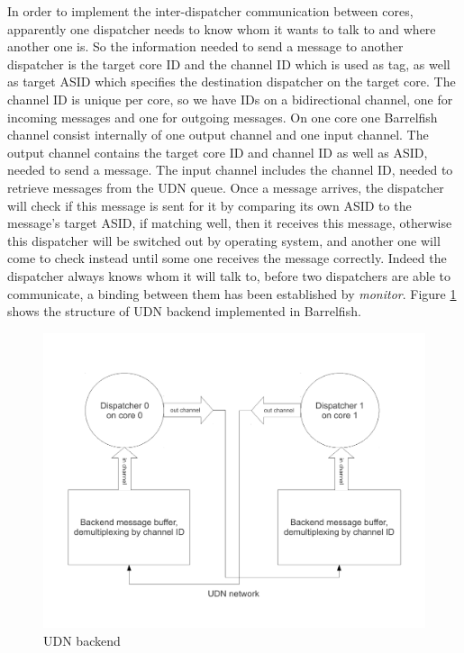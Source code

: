\documentclass[a4paper,twoside]{report} %
\begin{document}
In order to implement the inter-dispatcher communication between cores, apparently one dispatcher needs to know whom it wants to talk to and where another one is. So the information needed to send a message to another dispatcher is the target core ID and the channel ID which is used as tag, as well as target ASID which specifies the destination dispatcher on the target core. The channel ID is unique per core, so we have IDs on a bidirectional channel, one for incoming messages and one for outgoing messages. On one core one Barrelfish channel consist internally of one output channel and one input channel. The output channel contains the target core ID and channel ID as well as ASID, needed to send a message. The input channel includes the channel ID, needed to retrieve messages from the UDN queue. Once a message arrives, the dispatcher will check if this message is sent for it by comparing its own ASID to the message's target ASID, if matching well, then it receives this message, otherwise this dispatcher will be switched out by operating system, and another one will come to check instead until some one receives the message correctly. Indeed the dispatcher always knows whom it will talk to, before two dispatchers are able to communicate, a binding between them has been established by \emph{monitor}. Figure \ref{pic:udn} shows the structure of UDN backend implemented in Barrelfish.

\begin{figure}
\centering
\includegraphics[scale=0.45]{figures/udn_network}
\caption{UDN backend}
\label{pic:udn}
\end{figure}
\end{document}
